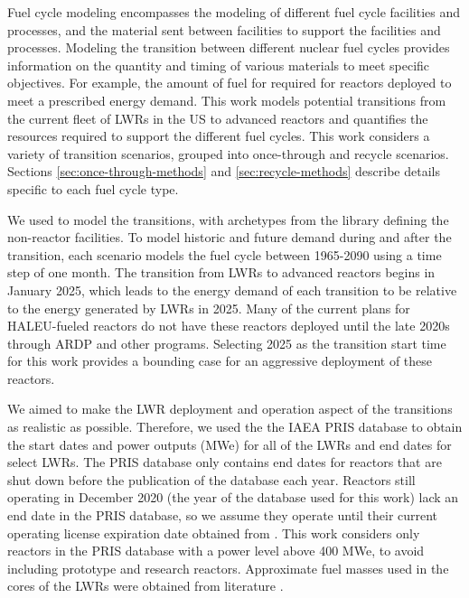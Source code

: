 Fuel cycle modeling encompasses the modeling of different 
fuel cycle facilities and processes, and the material 
sent between facilities to support the facilities and processes. 
Modeling the transition between different nuclear fuel cycles provides 
information on the quantity and timing of various materials to meet 
specific objectives. For example, the 
amount of fuel for required for reactors deployed to meet a 
prescribed energy demand. 
This work models potential transitions from the 
current fleet of \glspl{LWR} in the US to advanced reactors and 
quantifies the 
resources required to support the different fuel cycles. 
This work considers a variety of transition scenarios, grouped 
into once-through and recycle scenarios. Sections \ref{sec:once-through-methods}
and \ref{sec:recycle-methods} describe details specific to each 
fuel cycle type.

We used \Cyclus \cite{huff_fundamental_2016} to model the transitions, 
with archetypes from the \Cycamore library \cite{carlsen_cycamore_2014}
defining the non-reactor facilities. To model 
historic and future demand during and after the transition,
each scenario models the fuel 
cycle between 1965-2090 using a time step of one month. 
The transition from \glspl{LWR} 
to advanced reactors begins in January 2025, which leads to 
the energy demand of each transition to be relative to the energy generated by 
\glspl{LWR} in 2025.  Many of the 
current plans for \gls{HALEU}-fueled reactors do not have these reactors 
deployed until the late 2020s \cite{nichol_current_2021} through \gls{ARDP} 
and other programs. Selecting 2025 as the transition 
start time for this work provides a bounding case for 
an aggressive deployment of these reactors. 

We aimed to make the \gls{LWR} deployment and operation 
aspect of the transitions as realistic as possible. Therefore, 
we used the the \gls{IAEA} \gls{PRIS} 
database \cite{noauthor_power_1989} to obtain the start dates and 
power outputs (MWe) for all of the \glspl{LWR} and end 
dates for select \glspl{LWR}. The \gls{PRIS} database only contains end dates 
for reactors that are shut down before the publication of the 
database each year. Reactors still operating in December 2020  
(the year of the database used for this work) lack an end date 
in the \gls{PRIS} database, so we assume they operate until 
their current operating license expiration date obtained from  
\cite{nuclear_energy_institute_us_2021}. This work considers only 
reactors in the \gls{PRIS} database with a power level above 400 MWe, 
to avoid including prototype and research reactors. 
Approximate fuel masses used in the cores of the \glspl{LWR} were obtained 
from literature \cite{todreas_nuclear_2012,cacuci_handbook_2010}. 

